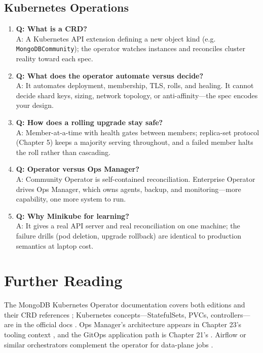 \subsection{Kubernetes Operations}
\begin{enumerate}
    \item \textbf{Q: What is a CRD?}\\
    A: A Kubernetes API extension defining a new object kind (e.g. \texttt{MongoDBCommunity}); the operator watches instances and reconciles cluster reality toward each spec.

    \item \textbf{Q: What does the operator automate versus decide?}\\
    A: It automates deployment, membership, TLS, rolls, and healing. It cannot decide shard keys, sizing, network topology, or anti-affinity---the spec encodes your design.

    \item \textbf{Q: How does a rolling upgrade stay safe?}\\
    A: Member-at-a-time with health gates between members; replica-set protocol (Chapter 5) keeps a majority serving throughout, and a failed member halts the roll rather than cascading.

    \item \textbf{Q: Operator versus Ops Manager?}\\
    A: Community Operator is self-contained reconciliation. Enterprise Operator drives Ops Manager, which owns agents, backup, and monitoring---more capability, one more system to run.

    \item \textbf{Q: Why Minikube for learning?}\\
    A: It gives a real API server and real reconciliation on one machine; the failure drills (pod deletion, upgrade rollback) are identical to production semantics at laptop cost.
\end{enumerate}

\section{Further Reading}
The MongoDB Kubernetes Operator documentation covers both editions and their CRD references \cite{mongodbK8sOperatorDocs}; Kubernetes concepts---StatefulSets, PVCs, controllers---are in the official docs \cite{kubernetesDocs}. Ops Manager's architecture appears in Chapter 23's tooling context \cite{mongodbOpsManagerDocs}, and the GitOps application path is Chapter 21's \cite{terraformDocs}. Airflow or similar orchestrators complement the operator for data-plane jobs \cite{apacheAirflowRepo}.

